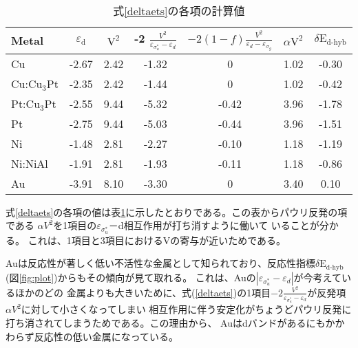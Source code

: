 \documentclass[12pt]{ltjsarticle}
\begin{document}
\begin{table}[htb]
  \begin{center}
    \caption{式\ref{deltaets}の各項の計算値}
    \begin{tabular}{l|cccccc} \hline
    \label{table}
      Metal & $\varepsilon_\text{d}$ & $\text{V}^\text{2}$ & -2 $\frac{ V^2 }{\varepsilon _{\sigma_u^*}- \varepsilon _d}$ & $-2(1-f)\frac{V^2}{\varepsilon _d - \varepsilon _{\sigma_g}} $ & $\alpha \text{V}^\text{2}$ & $\delta \text{E}_\text{d-hyb}$ \\ \hline
      Cu                        & -2.67 & 2.42 & -1.32 & 0     & 1.02 & -0.30 \\
      Cu:$\text{Cu}_\text{3}$Pt & -2.35 & 2.42 & -1.44 & 0     & 1.02 & -0.42 \\
      Pt:$\text{Cu}_\text{3}$Pt & -2.55 & 9.44 & -5.32 & -0.42 & 3.96 & -1.78 \\
      Pt                        & -2.75 & 9.44 & -5.03 & -0.44 & 3.96 & -1.51 \\
      Ni                        & -1.48 & 2.81 & -2.27 & -0.10 & 1.18 & -1.19 \\ 
      Ni:NiAl                   & -1.91 & 2.81 & -1.93 & -0.11 & 1.18 & -0.86 \\
      Au                        & -3.91 & 8.10 & -3.30 & 0     & 3.40 & 0.10  \\ \hline
    \end{tabular}
  \end{center}
\end{table}

式\ref{deltaets}の各項の値は表\ref{table}に示したとおりである。この表からパウリ反発の項である
$\alpha V^2$を1項目の$\varepsilon _{\sigma_u^*}$－d相互作用が打ち消すように働いて
いることが分かる。
これは、1項目と3項目におけるVの寄与が近いためである。

Auは反応性が著しく低い不活性な金属として知られており、反応性指標$\delta \text{E}_\text{d-hyb}$
(図\ref{fig:plot})からもその傾向が見て取れる。
これは、Auの$| \varepsilon _{\sigma_u^*} - \varepsilon _d|$が今考えているほかのどの
金属よりも大きいために、式(\ref{deltaets})の1項目$-2 \frac{ V^2 }{\varepsilon _
{\sigma_u^*} - \varepsilon _d}$が反発項$\alpha V^2$に対して小さくなってしまい
相互作用に伴う安定化がちょうどパウリ反発に打ち消されてしまうためである。この理由から、
Auはdバンドがあるにもかかわらず反応性の低い金属になっている。
\end{document}
